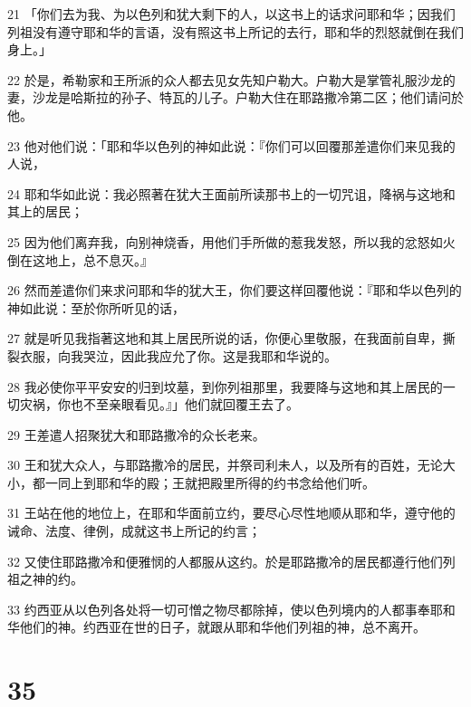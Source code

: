 \par 21 「你们去为我、为以色列和犹大剩下的人，以这书上的话求问耶和华；因我们列祖没有遵守耶和华的言语，没有照这书上所记的去行，耶和华的烈怒就倒在我们身上。」
\par 22 於是，希勒家和王所派的众人都去见女先知户勒大。户勒大是掌管礼服沙龙的妻，沙龙是哈斯拉的孙子、特瓦的儿子。户勒大住在耶路撒冷第二区；他们请问於他。
\par 23 他对他们说：「耶和华以色列的神如此说：『你们可以回覆那差遣你们来见我的人说，
\par 24 耶和华如此说：我必照著在犹大王面前所读那书上的一切咒诅，降祸与这地和其上的居民；
\par 25 因为他们离弃我，向别神烧香，用他们手所做的惹我发怒，所以我的忿怒如火倒在这地上，总不息灭。』
\par 26 然而差遣你们来求问耶和华的犹大王，你们要这样回覆他说：『耶和华以色列的神如此说：至於你所听见的话，
\par 27 就是听见我指著这地和其上居民所说的话，你便心里敬服，在我面前自卑，撕裂衣服，向我哭泣，因此我应允了你。这是我耶和华说的。
\par 28 我必使你平平安安的归到坟墓，到你列祖那里，我要降与这地和其上居民的一切灾祸，你也不至亲眼看见。』」他们就回覆王去了。
\par 29 王差遣人招聚犹大和耶路撒冷的众长老来。
\par 30 王和犹大众人，与耶路撒冷的居民，并祭司利未人，以及所有的百姓，无论大小，都一同上到耶和华的殿；王就把殿里所得的约书念给他们听。
\par 31 王站在他的地位上，在耶和华面前立约，要尽心尽性地顺从耶和华，遵守他的诫命、法度、律例，成就这书上所记的约言；
\par 32 又使住耶路撒冷和便雅悯的人都服从这约。於是耶路撒冷的居民都遵行他们列祖之神的约。
\par 33 约西亚从以色列各处将一切可憎之物尽都除掉，使以色列境内的人都事奉耶和华他们的神。约西亚在世的日子，就跟从耶和华他们列祖的神，总不离开。

\chapter{35}

